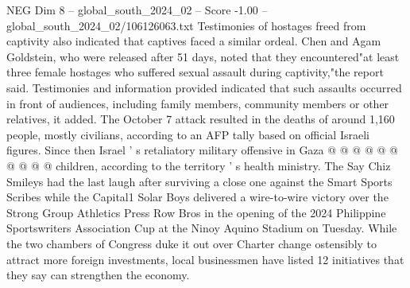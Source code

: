 \begin{textsample}{NEG Dim 8 – global\_south\_2024\_02 – Score -1.00 – global\_south\_2024\_02/106126063.txt}
Testimonies of hostages freed from captivity also indicated that captives faced a similar ordeal.
Chen and Agam Goldstein, who were released after 51 days, noted that they encountered"at least three female hostages who suffered sexual assault during captivity,"the report said.
Testimonies and information provided indicated that such assaults occurred in front of audiences, including family members, community members or other relatives, it added.
The October 7 attack resulted in the deaths of around 1,160 people, mostly civilians, according to an AFP tally based on official Israeli figures.
Since then Israel ' s retaliatory military offensive in Gaza @ @ @ @ @ @ @ @ @ @ children, according to the territory ' s health ministry.
The Say Chiz Smileys had the last laugh after surviving a close one against the Smart Sports Scribes while the Capital1 Solar Boys delivered a wire-to-wire victory over the Strong Group Athletics Press Row Bros in the opening of the 2024 Philippine Sportswriters Association Cup at the Ninoy Aquino Stadium on Tuesday.
While the two chambers of Congress duke it out over Charter change ostensibly to attract more foreign investments, local businessmen have listed 12 initiatives that they say can strengthen the economy.

\end{textsample}
